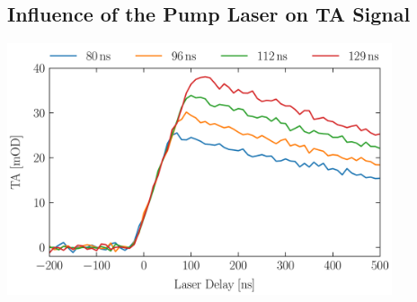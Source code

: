 \subsection{Influence of the Pump Laser on TA Signal}

\begin{center}
    \captionsetup{type = figure}
    \includegraphics[width = 0.85\textwidth]{Pictures/Evaluation/42/Pump-Laser.pdf}
    \label{fig:pumpLaser}
\end{center}